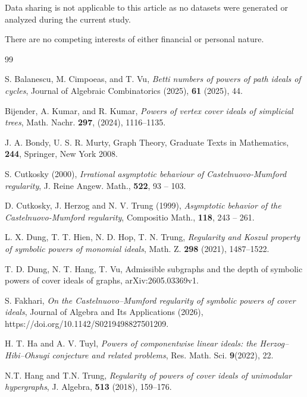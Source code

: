 \documentclass[12pt,amscd]{amsart}
\theoremstyle{definition}
\begin{document}
  
\vspace{1cm}
 Data sharing is not applicable to this article as no datasets were generated or analyzed during the current study.

 There are no competing interests of either financial or personal nature.

\begin{thebibliography}{99} 


 S. Balanescu, M. Cimpoeas, and T. Vu, {\it Betti numbers of powers of path ideals of cycles}, Journal of Algebraic Combinatorics (2025), {\bf 61} (2025), 44.

 Bijender, A. Kumar, and R. Kumar, {\it Powers of vertex cover ideals of simplicial trees}, Math. Nachr. {\bf 297}, (2024), 1116--1135.



 J. A. Bondy, U. S. R. Murty, Graph Theory,  Graduate Texts in Mathematics,  {\bf 244},  Springer, New York 2008.

 S. Cutkosky (2000), {\it Irrational asymptotic behaviour of Castelnuovo-Mumford regularity}, J. Reine Angew. Math., {\bf 522}, 93 -- 103.


 D. Cutkosky, J. Herzog and N. V. Trung (1999), {\it Asymptotic behavior of the Castelnuovo-Mumford regularity}, Compositio Math., {\bf 118}, 243 -- 261.


 L. X. Dung, T. T. Hien, N. D. Hop, T. N. Trung, {\it Regularity and Koszul property of symbolic powers of monomial ideals}, Math. Z. {\bf 298} (2021), 1487--1522.

 T. D. Dung, N. T. Hang, T. Vu, Admissible subgraphs and the depth of symbolic powers of cover ideals of graphs, arXiv:2605.03369v1.

 S. Fakhari, {\it On the Castelnuovo–Mumford regularity of symbolic powers of cover ideals}, Journal of Algebra and Its Applications (2026), https://doi.org/10.1142/S0219498827501209.


  H. T. Ha and A. V. Tuyl, {\it Powers of componentwise linear ideals: the Herzog–Hibi–Ohsugi conjecture and related problems}, Res. Math. Sci. {\bf 9}(2022), 22.


 N.T. Hang and T.N. Trung, {\it Regularity of powers of cover ideals of unimodular hypergraphs},  J. Algebra, \textbf{513}  (2018), 159–176.




\end{thebibliography}
\end{document}
